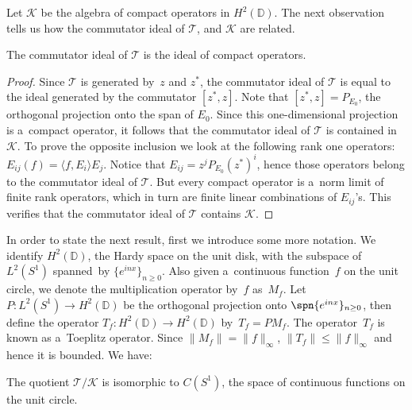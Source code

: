 Let $\mathcal{K}$ be the algebra of compact operators in $H^2({\mathbb D})$.
The next observation tells us how the commutator ideal of $\mathcal{T}$, and $\mathcal{K}$ are related.

\begin{Theorem}
The commutator ideal of $\mathcal{T}$ is the ideal of compact operators.
\end{Theorem}

\begin{proof}
Since $\mathcal{T}$ is generated by~$z$ and $z^*$, the commutator ideal of $\mathcal{T}$ is equal to the ideal generated
by the commutator $[z^*,z]$.
Note that $[z^*,z]=P_{E_0}$, the orthogonal projection onto the span of $E_0$.
Since this one-dimensional projection is a~compact operator, it follows that the commutator ideal of $\mathcal{T}$ is
contained in $\mathcal{K}$.
To prove the opposite inclusion we look at the following rank one operators: $E_{ij}(f)=\langle f, E_i\rangle E_j$.
Notice that $E_{ij}=z^jP_{E_0}(z^*)^i$, hence those operators belong to the commutator ideal of $\mathcal{T}$.
But every compact operator is a~norm limit of f\/inite rank operators, which in turn are f\/inite linear combinations of
$E_{ij}$'s.
This verif\/ies that the commutator ideal of $\mathcal{T}$ contains $\mathcal{K}$.
\end{proof}

In order to state the next result, f\/irst we introduce some more notation.
We identify $H^2({\mathbb D})$, the Hardy space on the unit disk, with the subspace of $L^2(S^1)$ spanned~by
$\{e^{inx}\}_{n\ge0}$.
Also given a~continuous function~$f$ on the unit circle, we denote the multiplication operator by~$f$ as~$M_f$.
Let $P:L^2(S^1)\to H^2({\mathbb D})$ be the orthogonal projection onto $\spn\{e^{inx}\}_{n\ge0}$, then def\/ine
the operator $T_f: H^2({\mathbb D}) \to H^2({\mathbb D})$ by~$T_f=PM_f$.
The operator~$T_f$ is known as a~Toeplitz operator.
Since $\|M_f\|=\|f\|_{\infty}$, $\|T_f\|\le \|f\|_{\infty}$ and hence it is bounded.
We have:

\begin{Theorem}
\label{toeplitz_disk}
The quotient $\mathcal{T}/\mathcal{K}$ is isomorphic to $C(S^1)$, the space of continuous functions on the unit circle.
\end{Theorem}

